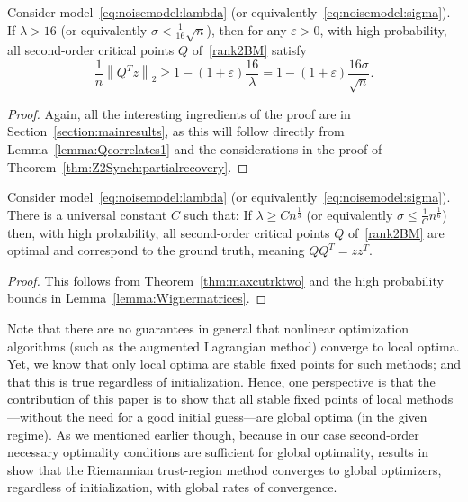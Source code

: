 \documentclass{colt2016} %
\newcommand{\1}{\mathbf{1}}
\newcommand{\eps}{\varepsilon}
\newcommand{\TODO}[1]{{\color{red}{[#1]}}}
\begin{document}
\begin{theorem}\label{lem:Z2Synch:almostexactrecovery}
Consider model~\eqref{eq:noisemodel:lambda} (or equivalently~\eqref{eq:noisemodel:sigma}). If $\lambda > 16$ (or equivalently $\sigma < \frac1{16}\sqrt{n}$), then for any $\eps>0$, with high probability,
all second-order critical points $Q$ of~\eqref{rank2BM} satisfy
\begin{equation}\label{eq:nontrivialcorrelation_0}
\frac1{n} \left\| Q^Tz\right\|_2 \geq 1 - (1+\eps)\frac{16}{\lambda} =  1 - (1+\eps)\frac{16\sigma}{\sqrt{n}}.
\end{equation}
\end{theorem}
\begin{proof}
Again, all the interesting ingredients of the proof are in Section~\ref{section:mainresults}, as this will follow directly from Lemma~\ref{lemma:Qcorrelates1} and the considerations in the proof of Theorem~\ref{thm:Z2Synch:partialrecovery}.
\end{proof}

\begin{theorem}\label{lem:Z2Synch:exactrecovery}
Consider model~\eqref{eq:noisemodel:lambda} (or equivalently~\eqref{eq:noisemodel:sigma}). There is a universal constant $C$ such that: If $\lambda \geq Cn^{\frac13}$ (or equivalently $\sigma \leq \frac1{C}n^{\frac16}$) then, with high probability, all second-order critical points $Q$ of~\eqref{rank2BM} are optimal and correspond to the ground truth, meaning $QQ^T = zz^T$.
\end{theorem}
\begin{proof}
	This follows from Theorem~\ref{thm:maxcutrktwo} and the high probability bounds in Lemma~\ref{lemma:Wignermatrices}.
\end{proof}








Note that there are no guarantees in general that nonlinear optimization algorithms (such as the augmented Lagrangian method) converge to local optima. Yet, we know that only local optima are stable fixed points for such methods; and that this is true regardless of initialization. Hence, one perspective is that the contribution of this paper is to show that all stable fixed points of local methods---without the need for a good initial guess---are global optima (in the given regime). As we mentioned earlier though, because in our case second-order necessary optimality conditions are sufficient for global optimality, results in~\citep{boumal2016complexity} show that the Riemannian trust-region method converges to global optimizers, regardless of initialization, with global rates of convergence.
\end{document}
